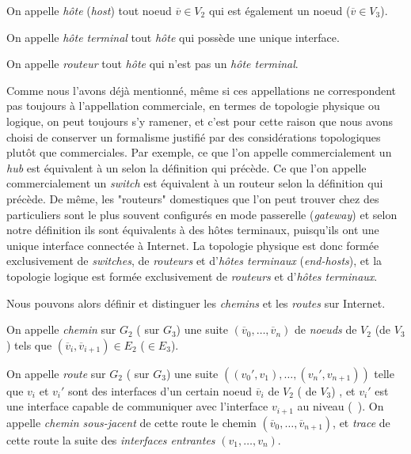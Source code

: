 \begin{definition}[Hôte]
On appelle {\em hôte} ({\em host}) tout noeud $\overline{v} \in V_2$ qui est
également un noeud \LLL ($\overline{v} \in V_3$).
\label{def:host}
\end{definition}

\begin{definition}
On appelle {\em hôte terminal} tout {\em hôte} qui possède une unique interface.
\label{def:endhost}
\end{definition}

\begin{definition}[Routeur] On appelle {\em routeur} tout {\em hôte} qui n'est
pas un {\em hôte terminal}.
\label{def:routeur}
\end{definition}

Comme nous l'avons déjà mentionné, même si ces appellations ne correspondent pas
toujours à l'appellation commerciale, en termes de topologie physique ou
logique, on peut toujours s'y ramener, et c'est pour cette raison que nous avons
choisi de conserver un formalisme justifié par des considérations topologiques
plutôt que commerciales. Par exemple, ce que l'on appelle commercialement un
{\em hub} est équivalent à un \switch selon la définition qui précède. Ce que
l'on appelle commercialement un {\em switch \LLL} est équivalent à un routeur
selon la définition qui précède. De même, les "routeurs" domestiques que l'on
peut trouver chez des particuliers sont le plus souvent configurés en mode
passerelle ({\em gateway}) et selon notre définition ils sont équivalents à
des hôtes terminaux, puisqu'ils ont une unique interface connectée à Internet.
La topologie physique est donc formée exclusivement de {\em switches}, de {\em
routeurs} et d'{\em hôtes terminaux} ({\em end-hosts}), et la topologie logique
est formée exclusivement de {\em routeurs} et d'{\em hôtes terminaux}.

Nous pouvons alors définir et distinguer les {\em chemins} et les {\em routes}
sur Internet.

\begin{definition} On appelle {\em chemin} sur $G_2$ (\resp
sur $G_3$) une suite $({\overline v_0}, \ldots, {\overline v_n})$ de {\em
noeuds} de $V_2$ (\resp de $V_3$) tels que $({\overline v_i}, {\overline
v_{i+1}}) \in E_2$ (\resp $\in E_3$).
\label{def:chemin}
\end{definition}

\begin{definition} On appelle {\em route} sur $G_2$ (\resp
sur $G_3$) une suite $((v_0', v_1), \ldots, (v_n', v_{n+1}))$ telle que $v_i$ et
$v_i'$ sont des interfaces d'un certain noeud ${\overline v_i}$ de $V_2$ (\resp
de $V_3$) , et $v_i'$ est une interface capable de communiquer avec l'interface
$v_{i+1}$ au niveau \LL (\resp~\LLL).
On appelle {\em chemin sous-jacent} de cette route le chemin $({\overline v_0},
\ldots, {\overline v_{n+1}})$, et {\em trace} de cette route la suite des {\em
interfaces entrantes} $(v_1, \ldots, v_n)$.
\label{def:route}
\end{definition}

